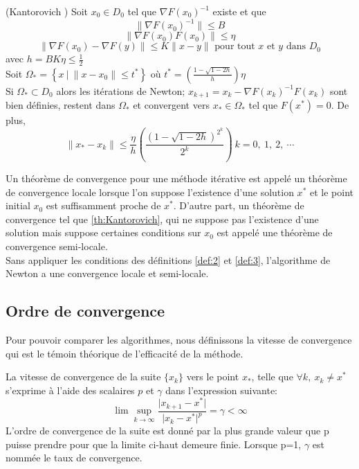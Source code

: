 \begin{frtheoreme}(Kantorovich \cite{Kantorovich})
\label{th:Kantorovich}
Soit $x_0 \in D_0$ tel que $\nabla F(x_0)^{-1}$ existe et que \\
$$\lVert \nabla F(x_0)^{-1} \rVert \leq B$$
$$\lVert \nabla F(x_0)F(x_0) \rVert \leq \eta$$
$$ \lVert \nabla F(x_0)- \nabla F(y)\rVert \leq K\lVert x-y \rVert \text{ pour tout }x\text{ et }y\text{ dans }D_0 $$
avec $h=BK\eta \leq \frac{1}{2}$\\
Soit $\Omega_*=\left\{x\ |\ \lVert x-x_0 \rVert \leq t^*\right\}$ o\`u $t^*=\left(\frac{1-\sqrt{1-2h}}{h} \right)\eta$\\
Si $\Omega_* \subset D_0$ alors les it\'erations de Newton; $x_{k+1}=x_k-\nabla F(x_k)^{-1}F(x_k)$ sont bien
d\'efinies, restent dans $\Omega_*$ et convergent vers $x_*\in \Omega_*$ tel que $F(x^*)=0$. De plus,
$$\lVert x_*-x_k \rVert \leq \frac{\eta}{h}\left(\frac{(1-\sqrt{1-2h})^{2^k}}{2^k}\right)\ k=0,\ 1,\ 2,\ \cdots$$
\end{frtheoreme}


Un th\'eor\`eme de convergence pour une m\'ethode it\'erative est appel\'e un th\'eor\`eme de convergence
locale lorsque l'on suppose l'existence d'une solution $x^*$ et le point initial $x_0$ est
suffisamment proche de $x^*$. D'autre part, un th\'eor\`eme de convergence tel que \ref{th:Kantorovich},
qui ne suppose pas l'existence d'une solution mais suppose certaines conditions sur $x_0$ est
appel\'e une th\'eor\`eme de convergence semi-locale.\\

Sans appliquer les conditions des d\'efinitions \ref{def:2} et \ref{def:3}, l'algorithme de Newton
a une convergence locale et semi-locale.



\subsection{Ordre de convergence}
Pour pouvoir comparer les algorithmes, nous d\'efinissons la vitesse de convergence qui
est le t\'emoin th\'eorique de l'efficacit\'e de la m\'ethode.

\begin{frdefinition}
\label{def:convergence}
La vitesse de convergence de la suite $\{x_k\}$ vers le point $x_*$, telle que $\forall k,\ x_k \neq x^*$ s'exprime
\`a l'aide des scalaires $p$ et $\gamma$ dans l'expression suivante:
$$\lim \sup_{k\rightarrow \infty}\frac{\lvert x_{k+1}-x^*\rvert}{\lvert x_k-x^* \rvert^p}=\gamma< \infty $$
L'ordre de convergence de la suite est donn\'e par la plus grande valeur que p puisse prendre pour que la limite
ci-haut demeure finie. Lorsque p=1, $\gamma$ est nomm\'ee le taux de convergence.
\end{frdefinition}

